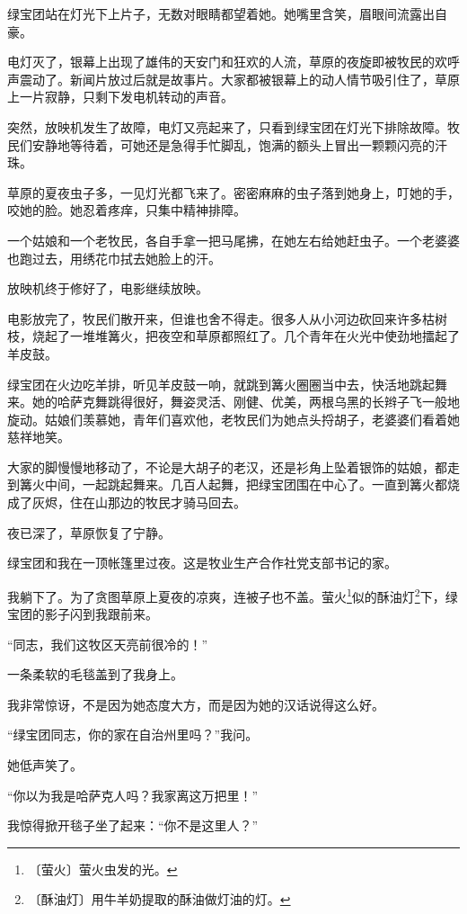 \documentclass[12pt,UTF-8,openany]{ctexbook}
\begin{document}
\begin{Large}
    绿宝团站在灯光下上片子，无数对眼睛都望着她。她嘴里含笑，眉眼间流露出自豪。
    
    电灯灭了，银幕上出现了雄伟的天安门和狂欢的人流，草原的夜旋即被牧民的欢呼声震动了。新闻片放过后就是故事片。大家都被银幕上的动人情节吸引住了，草原上一片寂静，只剩下发电机转动的声音。
    
    突然，放映机发生了故障，电灯又亮起来了，只看到绿宝团在灯光下排除故障。牧民们安静地等待着，可她还是急得手忙脚乱，饱满的额头上冒出一颗颗闪亮的汗珠。
    
    草原的夏夜虫子多，一见灯光都飞来了。密密麻麻的虫子落到她身上，叮她的手，咬她的脸。她忍着疼痒，只集中精神排障。
    
    一个姑娘和一个老牧民，各自手拿一把马尾拂，在她左右给她赶虫子。一个老婆婆也跑过去，用绣花巾拭去她脸上的汗。
    
    放映机终于修好了，电影继续放映。
    
    电影放完了，牧民们散开来，但谁也舍不得走。很多人从小河边砍回来许多枯树枝，烧起了一堆堆篝火，把夜空和草原都照红了。几个青年在火光中使劲地擂起了羊皮鼓。
    
    绿宝团在火边吃羊排，听见羊皮鼓一响，就跳到篝火圈圈当中去，快活地跳起舞来。她的哈萨克舞跳得很好，舞姿灵活、刚健、优美，两根乌黑的长辫子飞一般地旋动。姑娘们羡慕她，青年们喜欢他，老牧民们为她点头捋胡子，老婆婆们看着她慈祥地笑。
    
    大家的脚慢慢地移动了，不论是大胡子的老汉，还是衫角上坠着银饰的姑娘，都走到篝火中间，一起跳起舞来。几百人起舞，把绿宝团围在中心了。一直到篝火都烧成了灰烬，住在山那边的牧民才骑马回去。
    
    夜已深了，草原恢复了宁静。
    
    绿宝团和我在一顶帐篷里过夜。这是牧业生产合作社党支部书记的家。
    
    我躺下了。为了贪图草原上夏夜的凉爽，连被子也不盖。萤火\footnote{〔萤火〕萤火虫发的光。}似的酥油灯\footnote{〔酥油灯〕用牛羊奶提取的酥油做灯油的灯。}下，绿宝团的影子闪到我跟前来。
    
    “同志，我们这牧区天亮前很冷的！”
    
    一条柔软的毛毯盖到了我身上。
    
    我非常惊讶，不是因为她态度大方，而是因为她的汉话说得这么好。
    
    “绿宝团同志，你的家在自治州里吗？”我问。
    
    她低声笑了。
    
    “你以为我是哈萨克人吗？我家离这万把里！”
    
    我惊得掀开毯子坐了起来：“你不是这里人？”
    

\end{Large}
\end{document}
